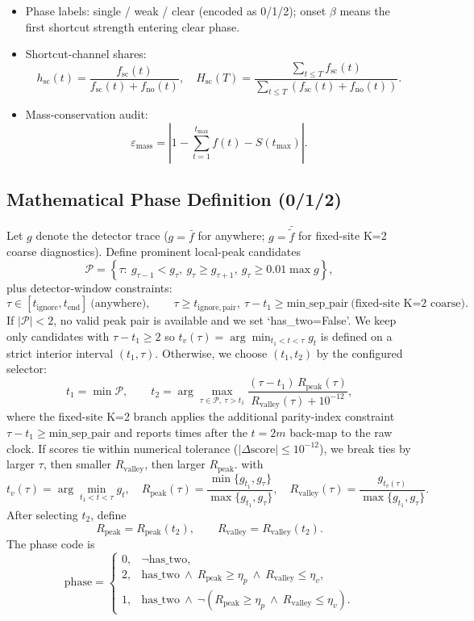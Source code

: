 \documentclass[11pt]{article}
\begin{document}
\begin{itemize}[leftmargin=1.4em]
  \item Phase labels: single / weak / clear (encoded as 0/1/2);
  onset $\beta$ means the first shortcut strength entering clear phase.
  \item Shortcut-channel shares:
  \[
  h_{\mathrm{sc}}(t)=\frac{f_{\mathrm{sc}}(t)}{f_{\mathrm{sc}}(t)+f_{\mathrm{no}}(t)},\quad
  H_{\mathrm{sc}}(T)=\frac{\sum_{t\le T} f_{\mathrm{sc}}(t)}{\sum_{t\le T}(f_{\mathrm{sc}}(t)+f_{\mathrm{no}}(t))}.
  \]
  \item Mass-conservation audit:
  \[
  \varepsilon_{\mathrm{mass}}=\left|1-\sum_{t=1}^{t_{\max}} f(t)-S(t_{\max})\right|.
  \]
\end{itemize}

\subsection*{Mathematical Phase Definition (0/1/2)}
Let $g$ denote the detector trace ($g=\bar f$ for anywhere; $g=\bar{\widetilde f}$ for fixed-site K=2 coarse diagnostics).
Define prominent local-peak candidates
\[
\mathcal P=\left\{\tau:\ g_{\tau-1}<g_{\tau},\ g_{\tau}\ge g_{\tau+1},\ g_{\tau}\ge 0.01\max g\right\},
\]
plus detector-window constraints:
\[
\tau\in[t_{\mathrm{ignore}},t_{\mathrm{end}}]\ \text{(anywhere)},\qquad
\tau\ge t_{\mathrm{ignore,pair}},\ \tau-t_1\ge\mathrm{min\_sep\_pair}\ \text{(fixed-site K=2 coarse)}.
\]
If $|\mathcal P|<2$, no valid peak pair is available and we set `has\_two=False'.
We keep only candidates with $\tau-t_1\ge2$ so
$t_v(\tau)=\arg\min_{t_1<t<\tau}g_t$ is defined on a strict interior interval $(t_1,\tau)$.
Otherwise, we choose $(t_1,t_2)$ by the configured selector:
\[
t_1=\min\mathcal P,\qquad
t_2=\arg\max_{\tau\in\mathcal P,\ \tau>t_1}
\frac{(\tau-t_1)\,R_{\mathrm{peak}}(\tau)}{R_{\mathrm{valley}}(\tau)+10^{-12}},
\]
where the fixed-site K=2 branch applies the additional parity-index constraint $\tau-t_1\ge\mathrm{min\_sep\_pair}$ and reports times after the $t=2m$ back-map to the raw clock.
If scores tie within numerical tolerance ($|\Delta\mathrm{score}|\le10^{-12}$), we break ties by larger $\tau$, then smaller $R_{\mathrm{valley}}$, then larger $R_{\mathrm{peak}}$.
with
\[
t_v(\tau)=\arg\min_{t_1<t<\tau}g_t,\quad
R_{\mathrm{peak}}(\tau)=\frac{\min\{g_{t_1},g_{\tau}\}}{\max\{g_{t_1},g_{\tau}\}},\quad
R_{\mathrm{valley}}(\tau)=\frac{g_{t_v(\tau)}}{\max\{g_{t_1},g_{\tau}\}}.
\]
After selecting $t_2$, define
\[
R_{\mathrm{peak}}=R_{\mathrm{peak}}(t_2),\qquad
R_{\mathrm{valley}}=R_{\mathrm{valley}}(t_2).
\]
The phase code is
\[
\mathrm{phase}=
\begin{cases}
0,& \neg\mathrm{has\_two},\\
2,& \mathrm{has\_two}\ \land\ R_{\mathrm{peak}}\ge\eta_p\ \land\ R_{\mathrm{valley}}\le\eta_v,\\
1,& \mathrm{has\_two}\ \land\ \neg\!\left(R_{\mathrm{peak}}\ge\eta_p\ \land\ R_{\mathrm{valley}}\le\eta_v\right).
\end{cases}
\]
\end{document}
